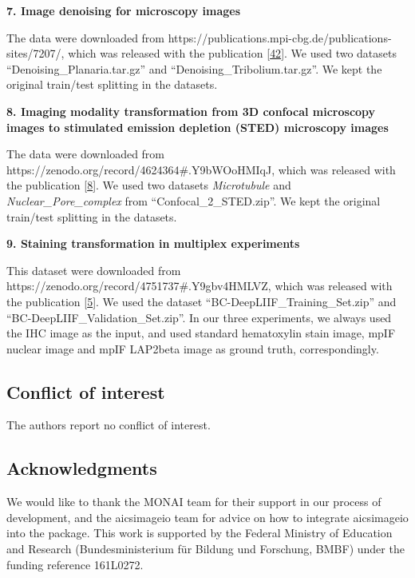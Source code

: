 \textbf{7. Image denoising for microscopy images}

The data were downloaded from https://publications.mpi-cbg.de/publications-sites/7207/, which was released with the publication {[}\protect\hyperlink{ref-12G712Zky}{42}{]}. We used two datasets ``Denoising\_Planaria.tar.gz'' and ``Denoising\_Tribolium.tar.gz''. We kept the original train/test splitting in the datasets.

\textbf{8. Imaging modality transformation from 3D confocal microscopy images to stimulated emission depletion (STED) microscopy images}

The data were downloaded from https://zenodo.org/record/4624364\#.Y9bWOoHMIqJ, which was released with the publication {[}\protect\hyperlink{ref-UEBDZ3tI}{8}{]}. We used two datasets \emph{Microtubule} and \emph{Nuclear\_Pore\_complex} from ``Confocal\_2\_STED.zip''. We kept the original train/test splitting in the datasets.

\textbf{9. Staining transformation in multiplex experiments}

This dataset were downloaded from https://zenodo.org/record/4751737\#.Y9gbv4HMLVZ, which was released with the publication {[}\protect\hyperlink{ref-WwenuBHa}{5}{]}. We used the dataset ``BC-DeepLIIF\_Training\_Set.zip'' and ``BC-DeepLIIF\_Validation\_Set.zip''. In our three experiments, we always used the IHC image as the input, and used standard hematoxylin stain image, mpIF nuclear image and mpIF LAP2beta image as ground truth, correspondingly.

\hypertarget{conflict-of-interest}{%
\subsection{Conflict of interest}\label{conflict-of-interest}}

The authors report no conflict of interest.

\hypertarget{acknowledgments}{%
\subsection{Acknowledgments}\label{acknowledgments}}

We would like to thank the MONAI team for their support in our process of development, and the aicsimageio team for advice on how to integrate aicsimageio into the package. This work is supported by the Federal Ministry of Education and Research (Bundesministerium für Bildung und Forschung, BMBF) under the funding reference 161L0272.

